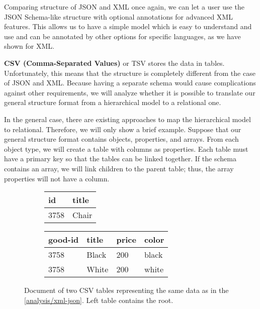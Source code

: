 Comparing structure of JSON and XML once again, we can let a user use the JSON Schema-like structure with optional annotations for advanced XML features. This allows us to have a simple model which is easy to understand and use and can be annotated by other options for specific languages, as we have shown for XML.

\smallskip

\textbf{CSV (Comma-Separated Values)} or TSV stores the data in tables. Unfortunately, this means that the structure is completely different from the case of JSON and XML. Because having a separate schema would cause complications against other requirements, we will analyze whether it is possible to translate our general structure format from a hierarchical model to a relational one.

In the general case, there are existing approaches \cite{10.1145/304181.304220, 10.1007/3-540-45271-0_10} to map the hierarchical model to relational. Therefore, we will only show a brief example. Suppose that our general structure format contains objects, properties, and arrays. From each object type, we will create a table with columns as properties. Each table must have a primary key so that the tables can be linked together. If the schema contains an array, we will link children to the parent table; thus, the array properties will not have a column.

\begin{figure}[h!]\centering
  \begin{subfigure}{.5\textwidth}
    \centering
    \begin{tabular}{ll}\toprule
      id   & title \\ \midrule
      3758 & Chair \\ \bottomrule
    \end{tabular}%
  \end{subfigure}%
  \begin{subfigure}{.5\textwidth}
    \centering
    \begin{tabular}{llll}\toprule
      good-id & title & price & color \\ \midrule
      3758 & Black & 200 & black \\
      3758 & White & 200 & white \\ \bottomrule
    \end{tabular}
  \end{subfigure}
  \caption{Document of two CSV tables representing the same data as in the \autoref{analysis/xml-json}. Left table contains the root.}
  \label{analysis/csv}
\end{figure}

